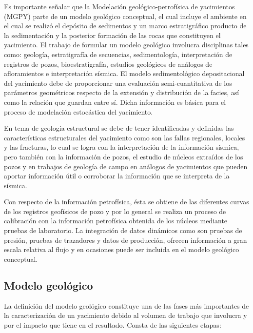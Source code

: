 Es importante se\~nalar que la Modelaci\'on  geol\'ogico-petrof\'isica de yacimientos (MGPY) parte de un modelo geol\'ogico conceptual, el cual incluye el ambiente en el cual se realiz\'o el dep\'osito de sedimentos y un marco estratigr\'afico producto de la sedimentaci\'on y la posterior formaci\'on de las rocas que constituyen el yacimiento. El trabajo de formular un modelo geol\'ogico involucra disciplinas tales como: geolog\'ia, estratigraf\'ia de secuencias, sedimentolog\'ia, interpretaci\'on de registros de pozos, bioestratigraf\'ia, estudios geol\'ogicos de an\'alogos de afloramientos e interpretaci\'on s\'ismica. El modelo sedimentol\'ogico depositacional del yacimiento debe de proporcionar una evaluaci\'on semi-cuantitativa de los par\'ametros geom\'etricos respecto de la extensi\'on y distribuci\'on de la facies, as\'i como la relaci\'on que guardan entre s\'i. Dicha informaci\'on es b\'asica para el proceso de modelaci\'on estoc\'astica del yacimiento.

En tema de geolog\'ia estructural se debe de tener identificadas y definidas las caracter\'isticas estructurales del yacimiento como son las fallas regionales, locales y las fracturas, lo cual se logra con la interpretaci\'on de la informaci\'on s\'ismica, pero tambi\'en con la informaci\'on de pozos, el estudio de n\'ucleos extra\'idos de los pozos y en trabajos de geolog\'ia de campo en an\'alogos de yacimientos que pueden aportar informaci\'on \'util o corroborar la informaci\'on que se interpreta de la s\'ismica.

Con respecto de la informaci\'on petrof\'isica, \'esta se obtiene de las diferentes curvas de los registros geof\'isicos de pozo y por lo general se realiza un proceso de calibraci\'on con la informaci\'on petrof\'isica obtenida de los n\'ucleos mediante pruebas de laboratorio.
La integraci\'on de datos din\'amicos como son pruebas de presi\'on, pruebas de trazadores y datos de producci\'on, ofrecen informaci\'on a gran escala relativa al flujo y en ocasiones puede ser incluida en el modelo geol\'ogico conceptual.

\subsection{Modelo geol\'ogico}

La definici\'on del modelo geol\'ogico constituye una de las fases m\'as importantes de la caracterizaci\'on de un yacimiento debido al volumen de trabajo que involucra y por el impacto que tiene en el resultado. Consta de las siguientes etapas:


